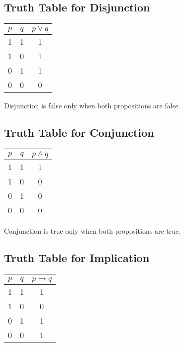 \documentclass[12pt,a4paper,openany]{article}
\begin{document}
\subsection{Truth Table for Disjunction}\label{truth-table-for-disjunction}

\begin{center}
\begin{tabular}{|c|c|c|}
\hline
\(p\) & \(q\) & \(p \lor q\) \\
\hline
1 & 1 & 1 \\
1 & 0 & 1 \\
0 & 1 & 1 \\
0 & 0 & 0 \\
\hline
\end{tabular}
\end{center}

Disjunction is false only when both propositions are false.

\subsection{Truth Table for Conjunction}\label{truth-table-for-conjunction}

\begin{center}
\begin{tabular}{|c|c|c|}
\hline
\(p\) & \(q\) & \(p \land q\) \\
\hline
1 & 1 & 1 \\
1 & 0 & 0 \\
0 & 1 & 0 \\
0 & 0 & 0 \\
\hline
\end{tabular}
\end{center}

Conjunction is true only when both propositions are true.

\subsection{Truth Table for Implication}\label{truth-table-for-implication}

\begin{center}
\begin{tabular}{|c|c|c|}
\hline
\(p\) & \(q\) & \(p \to q\) \\
\hline
1 & 1 & 1 \\
1 & 0 & 0 \\
0 & 1 & 1 \\
0 & 0 & 1 \\
\hline
\end{tabular}
\end{center}
\end{document}
